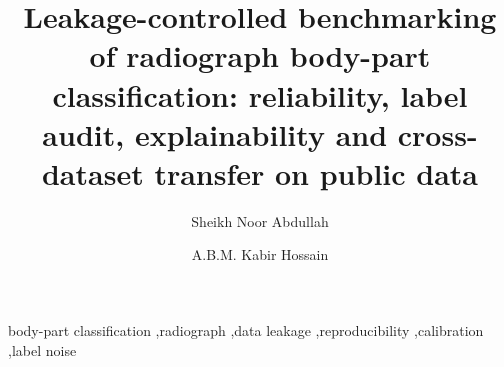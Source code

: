\documentclass[preprint,12pt,authoryear]{elsarticle}
\begin{document}
\setcounter{totalnumber}{1}\setcounter{topnumber}{1}\setcounter{bottomnumber}{0}
\begin{frontmatter}
\title{Leakage-controlled benchmarking of radiograph body-part classification: reliability, label audit, explainability and cross-dataset transfer on public data}
\author[1]{Sheikh Noor Abdullah}
\author[1]{A.B.M. Kabir Hossain}
\begin{abstract}

\end{abstract}
\begin{keyword}
body-part classification \sep radiograph \sep data leakage \sep reproducibility \sep calibration \sep label noise
\end{keyword}
\end{frontmatter}











\end{document}
